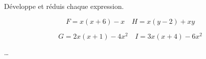 \begin{exercice*}
    Développe et réduis chaque expression.

    \[F = x(x + 6) - x \quad H = x(y - 2) + xy\]

    \[G = 2x(x + 1) - 4x^2 \quad I = 3x(x + 4) - 6x^2\]
\end{exercice*}
\begin{corrige}
    \dots
\end{corrige}

